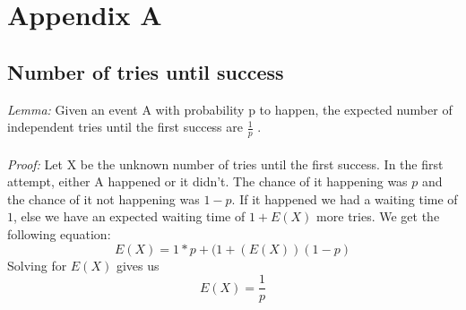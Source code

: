 \chapter{Appendix A}
\section{Number of tries until success}
\textit{Lemma:} Given an event A with probability p to happen, the expected number of independent tries until the first success are $\frac{1}{p}$ \cite{165994}.\\\\
\textit{Proof:} Let X be the unknown number of tries until the first success. In the first attempt, either A happened or it didn't. The chance of it happening was $p$ and the chance of it not happening was $1-p$. If it happened we had a waiting time of $1$, else we have an expected waiting time of $1 + E(X)$ more tries. We get the following equation: $$E(X) = 1*p + (1 + (E(X))(1-p)$$
Solving for $E(X)$ gives us $$E(X) = \frac{1}{p}$$
